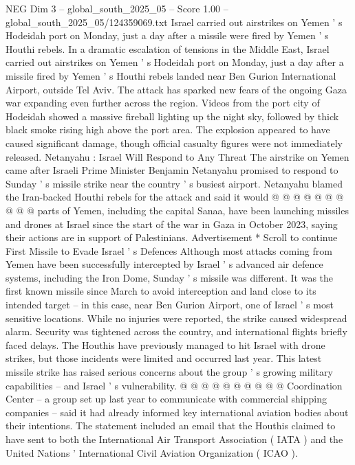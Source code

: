 \begin{textsample}{NEG Dim 3 – global\_south\_2025\_05 – Score 1.00 – global\_south\_2025\_05/124359069.txt}  \label{ex:f3_neg_223}
Israel carried out airstrikes on Yemen ' s Hodeidah port on Monday, just a day after a missile were fired by Yemen ' s Houthi rebels.
In a dramatic escalation of tensions in the Middle East, Israel carried out airstrikes on Yemen ' s Hodeidah port on Monday, just a day after a missile fired by Yemen ' s Houthi rebels landed near Ben Gurion International Airport, outside Tel Aviv.
The attack has sparked new fears of the ongoing Gaza war expanding even further across the region.
Videos from the port city of Hodeidah showed a massive fireball lighting up the night sky, followed by thick black smoke rising high above the port area.
The explosion appeared to have caused significant damage, though official casualty figures were not immediately released.
Netanyahu : Israel Will Respond to Any Threat The airstrike on Yemen came after Israeli Prime Minister Benjamin Netanyahu promised to respond to Sunday ' s missile strike near the country ' s busiest airport.
Netanyahu blamed the Iran-backed Houthi rebels for the attack and said it would @ @ @ @ @ @ @ @ @ @ parts of Yemen, including the capital Sanaa, have been launching missiles and drones at Israel since the start of the war in Gaza in October 2023, saying their actions are in support of Palestinians.
Advertisement * Scroll to continue First Missile to Evade Israel ' s Defences Although most attacks coming from Yemen have been successfully intercepted by Israel ' s advanced air defence systems, including the Iron Dome, Sunday ' s missile was different.
It was the first known missile since March to avoid interception and land close to its intended target -- in this case, near Ben Gurion Airport, one of Israel ' s most sensitive locations.
While no injuries were reported, the strike caused widespread alarm.
Security was tightened across the country, and international flights briefly faced delays.
The Houthis have previously managed to hit Israel with drone strikes, but those incidents were limited and occurred last year.
This latest missile strike has raised serious concerns about the group ' s growing military capabilities -- and Israel ' s vulnerability. @ @ @ @ @ @ @ @ @ @ Coordination Center -- a group set up last year to communicate with commercial shipping companies -- said it had already informed key international aviation bodies about their intentions.
The statement included an email that the Houthis claimed to have sent to both the International Air Transport Association ( IATA ) and the United Nations ' International Civil Aviation Organization ( ICAO ).

\end{textsample}
